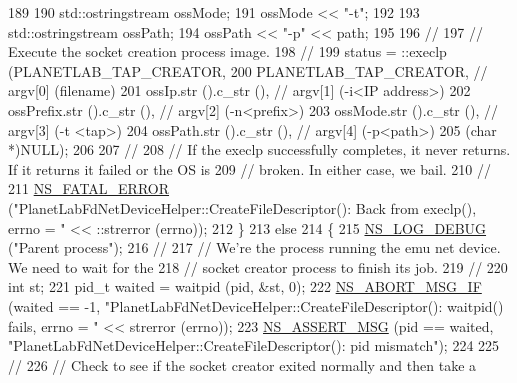 \begin{DoxyCode}
189 
190       std::ostringstream ossMode;
191       ossMode << \textcolor{stringliteral}{"-t"};
192 
193       std::ostringstream ossPath;
194       ossPath << \textcolor{stringliteral}{"-p"} << path;
195 
196       \textcolor{comment}{//}
197       \textcolor{comment}{// Execute the socket creation process image.}
198       \textcolor{comment}{//}
199       status = ::execlp (PLANETLAB\_TAP\_CREATOR,
200                          PLANETLAB\_TAP\_CREATOR,               \textcolor{comment}{// argv[0] (filename)}
201                          ossIp.str ().c\_str (),               \textcolor{comment}{// argv[1] (-i<IP address>)}
202                          ossPrefix.str ().c\_str (),           \textcolor{comment}{// argv[2] (-n<prefix>)}
203                          ossMode.str ().c\_str (),             \textcolor{comment}{// argv[3] (-t <tap>)}
204                          ossPath.str ().c\_str (),             \textcolor{comment}{// argv[4] (-p<path>)}
205                          (\textcolor{keywordtype}{char} *)NULL);
206 
207       \textcolor{comment}{//}
208       \textcolor{comment}{// If the execlp successfully completes, it never returns.  If it returns it failed or the OS is}
209       \textcolor{comment}{// broken.  In either case, we bail.}
210       \textcolor{comment}{//}
211       \hyperlink{group__fatal_ga5131d5e3f75d7d4cbfd706ac456fdc85}{NS\_FATAL\_ERROR} (\textcolor{stringliteral}{"PlanetLabFdNetDeviceHelper::CreateFileDescriptor(): Back from
       execlp(), errno = "} << ::strerror (errno));
212     \}
213   \textcolor{keywordflow}{else}
214     \{
215       \hyperlink{group__logging_ga413f1886406d49f59a6a0a89b77b4d0a}{NS\_LOG\_DEBUG} (\textcolor{stringliteral}{"Parent process"});
216       \textcolor{comment}{//}
217       \textcolor{comment}{// We're the process running the emu net device.  We need to wait for the}
218       \textcolor{comment}{// socket creator process to finish its job.}
219       \textcolor{comment}{//}
220       \textcolor{keywordtype}{int} st;
221       pid\_t waited = waitpid (pid, &st, 0);
222       \hyperlink{group__fatal_ga6653324225bc139e46deea177614ceee}{NS\_ABORT\_MSG\_IF} (waited == -1, \textcolor{stringliteral}{"PlanetLabFdNetDeviceHelper::CreateFileDescriptor():
       waitpid() fails, errno = "} << strerror (errno));
223       \hyperlink{assert_8h_aff5ece9066c74e681e74999856f08539}{NS\_ASSERT\_MSG} (pid == waited, \textcolor{stringliteral}{"PlanetLabFdNetDeviceHelper::CreateFileDescriptor(): pid
       mismatch"});
224 
225       \textcolor{comment}{//}
226       \textcolor{comment}{// Check to see if the socket creator exited normally and then take a}

\end{DoxyCode}

